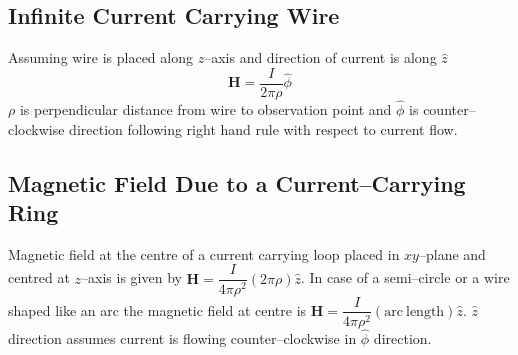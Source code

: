 \documentclass[12pt,a4paper]{article}
\begin{document}
\subsection{Infinite Current Carrying Wire}
Assuming wire is placed along $z$--axis and direction of current is along $\hat z$
\begin{equation}
\textbf{H}=\dfrac{I}{2\pi\rho}\hat\phi
\end{equation}
$\rho$ is perpendicular distance from wire to observation point and $\hat\phi$ is counter--clockwise direction following right hand rule with respect to current flow.
\subsection{Magnetic Field Due to a Current--Carrying Ring}
Magnetic field at the centre of a current carrying loop placed in $xy$--plane and centred at $z$--axis is given by $\textbf{H}=\dfrac{I}{4\pi\rho^2}(2\pi\rho)\hat z$. In case of a semi--circle or a wire shaped like an arc the magnetic field at centre is $\textbf{H}=\dfrac{I}{4\pi\rho^2}(\mathrm{arc~length})\hat z$. $\hat z$ direction assumes current is flowing counter--clockwise in $\hat\phi$ direction.


\end{document}
